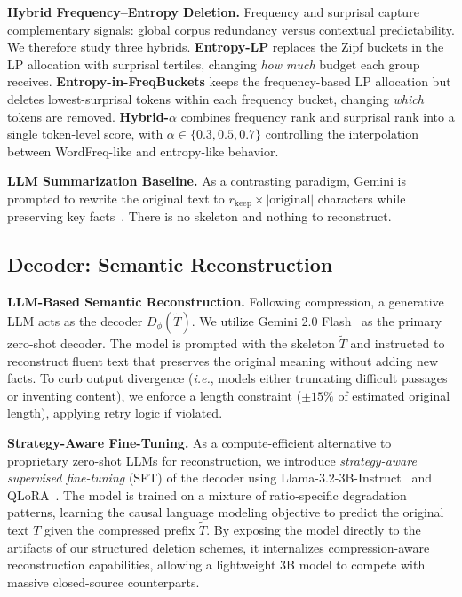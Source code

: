 \documentclass[11pt]{article}
\newcommand{\rkeep}{r_{\mathrm{keep}}}
\begin{document}
\textbf{Hybrid Frequency--Entropy Deletion.}
\label{sec:hybrid_method}
Frequency and surprisal capture complementary signals: global corpus redundancy versus contextual predictability. We therefore study three hybrids. \textbf{Entropy-LP} replaces the Zipf buckets in the LP allocation with surprisal tertiles, changing \emph{how much} budget each group receives. \textbf{Entropy-in-FreqBuckets} keeps the frequency-based LP allocation but deletes lowest-surprisal tokens within each frequency bucket, changing \emph{which} tokens are removed. \textbf{Hybrid-$\alpha$} combines frequency rank and surprisal rank into a single token-level score, with $\alpha \in \{0.3,0.5,0.7\}$ controlling the interpolation between WordFreq-like and entropy-like behavior.

\textbf{LLM Summarization Baseline.}
\label{sec:summarization}
As a contrasting paradigm, Gemini is prompted to rewrite the original text to $\rkeep \times |\text{original}|$ characters while preserving key facts~\citep{see2017get}. There is no skeleton and nothing to reconstruct.

\subsection*{Decoder: Semantic Reconstruction}

\textbf{LLM-Based Semantic Reconstruction.}
\label{sec:llm}
Following compression, a generative LLM acts as the decoder $D_\phi(\tilde{T})$. We utilize Gemini 2.0 Flash~\citep{geminiteam2025gemini20flash} as the primary zero-shot decoder. The model is prompted with the skeleton $\tilde{T}$ and instructed to reconstruct fluent text that preserves the original meaning without adding new facts. To curb output divergence ({\em i.e.}, models either truncating difficult passages or inventing content), we enforce a length constraint ($\pm 15\%$ of estimated original length), applying retry logic if violated.

\textbf{Strategy-Aware Fine-Tuning.}
\label{sec:finetune}
As a compute-efficient alternative to proprietary zero-shot LLMs for reconstruction, we introduce \textit{strategy-aware supervised fine-tuning} (SFT) of the decoder using Llama-3.2-3B-Instruct~\citep{dubey2024llama3} and QLoRA~\citep{dettmers2023qlora}. The model is trained on a mixture of ratio-specific degradation patterns, learning the causal language modeling objective to predict the original text $T$ given the compressed prefix $\tilde{T}$. By exposing the model directly to the artifacts of our structured deletion schemes, it internalizes compression-aware reconstruction capabilities, allowing a lightweight 3B model to compete with massive closed-source counterparts.
\end{document}
